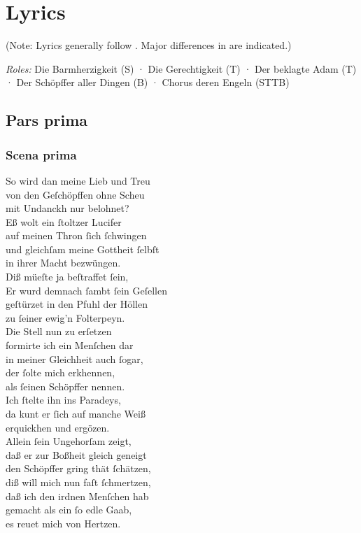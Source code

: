\documentclass{ees}
\newenvironment{lyrics}[1]{%
  \subsection{#1}\nopagebreak%
  \begin{lyricslist}%
  \let\voice\item%
}{%
  \end{lyricslist}%
}
\begin{document}
\clearscrheadfoot

\chapter{Lyrics}

(Note: Lyrics generally follow . Major differences in  are indicated.)

\textit{Roles:} Die Barmherzigkeit (S) · Die Gerechtigkeit (T) · Der beklagte Adam (T) · Der Schöpffer aller Dingen (B) · Chorus deren Engeln (STTB)

\section{Pars prima}

\begin{lyrics}{Scena prima}
  \voice[Schöpffer]
  So wird dan meine Lieb und Treu\\
  von den Geſchöpffen ohne Scheu\\
  mit Undanckh nur belohnet?\\
  Eß wolt ein ſtoltzer Lucifer\\
  auf meinen Thron ſich ſchwingen\\
  und gleichſam meine Gottheit ſelbſt\\
  in ihrer Macht bezwüngen.\\
  Diß müeſte ja beſtraffet ſein,\\
  Er wurd demnach ſambt ſein Geſellen\\
  geſtürzet in den Pfuhl der Höllen\\
  zu ſeiner ewig’n Folterpeyn.\\
  Die Stell nun zu erſetzen\\
  formirte ich ein Menſchen dar\\
  in meiner Gleichheit auch ſogar,\\
  der ſolte mich erkhennen,\\
  als ſeinen Schöpffer nennen.\\
  Ich ſtelte ihn ins Paradeys,\\
  da kunt er ſich auf manche Weiß\\
  erquickhen und ergözen.\\
  Allein ſein Ungehorſam zeigt,\\
  daß er zur Boßheit gleich geneigt\\
  den Schöpffer gring thät ſchätzen,\\
  diß will mich nun faſt ſchmertzen,\\
  daß ich den irdnen Menſchen hab\\
  gemacht als ein ſo edle Gaab,\\
  es reuet mich von Hertzen.
\end{lyrics}
\end{document}

